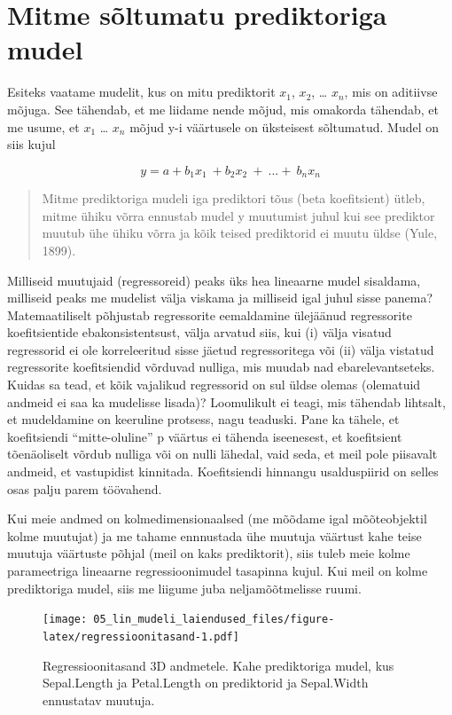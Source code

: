 \documentclass[]{book}
\begin{document}
\section{Mitme sõltumatu prediktoriga
mudel}\label{mitme-soltumatu-prediktoriga-mudel}

Esiteks vaatame mudelit, kus on mitu prediktorit \(x_1\), \(x_2\),
\ldots{} \(x_n\), mis on aditiivse mõjuga. See tähendab, et me liidame
nende mõjud, mis omakorda tähendab, et me usume, et \(x_1\) \ldots{}
\(x_n\) mõjud y-i väärtusele on üksteisest sõltumatud. Mudel on siis
kujul

\[y = a + b_1x_1~ + b_2x_2~ +~ ... +~ b_nx_n\]

\begin{quote}
Mitme prediktoriga mudeli iga prediktori tõus (beta koefitsient) ütleb,
mitme ühiku võrra ennustab mudel y muutumist juhul kui see prediktor
muutub ühe ühiku võrra ja kõik teised prediktorid ei muutu üldse (Yule,
1899).
\end{quote}

Milliseid muutujaid (regressoreid) peaks üks hea lineaarne mudel
sisaldama, milliseid peaks me mudelist välja viskama ja milliseid igal
juhul sisse panema? Matemaatiliselt põhjustab regressorite eemaldamine
ülejäänud regressorite koefitsientide ebakonsistentsust, välja arvatud
siis, kui (i) välja visatud regressorid ei ole korreleeritud sisse
jäetud regressoritega või (ii) välja vistatud regressorite koefitsiendid
võrduvad nulliga, mis muudab nad ebarelevantseteks. Kuidas sa tead, et
kõik vajalikud regressorid on sul üldse olemas (olematuid andmeid ei saa
ka mudelisse lisada)? Loomulikult ei teagi, mis tähendab lihtsalt, et
mudeldamine on keeruline protsess, nagu teaduski. Pane ka tähele, et
koefitsiendi ``mitte-oluline'' p väärtus ei tähenda iseenesest, et
koefitsient tõenäoliselt võrdub nulliga või on nulli lähedal, vaid seda,
et meil pole piisavalt andmeid, et vastupidist kinnitada. Koefitsiendi
hinnangu usalduspiirid on selles osas palju parem töövahend.

Kui meie andmed on kolmedimensionaalsed (me mõõdame igal mõõteobjektil
kolme muutujat) ja me tahame ennnustada ühe muutuja väärtust kahe teise
muutuja väärtuste põhjal (meil on kaks prediktorit), siis tuleb meie
kolme parameetriga lineaarne regressioonimudel tasapinna kujul. Kui meil
on kolme prediktoriga mudel, siis me liigume juba neljamõõtmelisse
ruumi.





\begin{figure}
\centering
\texttt{[image: 05\_lin\_mudeli\_laiendused\_files/figure-latex/regressioonitasand-1.pdf]}
\caption{\label{fig:regressioonitasand}Regressioonitasand 3D andmetele. Kahe
prediktoriga mudel, kus Sepal.Length ja Petal.Length on prediktorid ja
Sepal.Width ennustatav muutuja.}
\end{figure}
\end{document}
